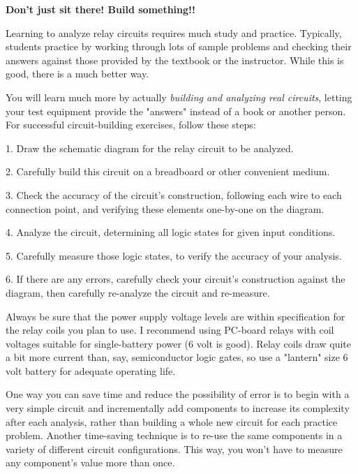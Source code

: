 

\centerline{\bf Don't just sit there!  Build something!!}

\vskip 10pt

Learning to analyze relay circuits requires much study and practice.  Typically, students practice by working through lots of sample problems and checking their answers against those provided by the textbook or the instructor.  While this is good, there is a much better way.

You will learn much more by actually {\it building and analyzing real circuits}, letting your test equipment provide the "answers" instead of a book or another person.  For successful circuit-building exercises, follow these steps:

\medskip
\item{1.} Draw the schematic diagram for the relay circuit to be analyzed.
\item{2.} Carefully build this circuit on a breadboard or other convenient medium.
\item{3.} Check the accuracy of the circuit's construction, following each wire to each connection point, and verifying these elements one-by-one on the diagram.
\item{4.} Analyze the circuit, determining all logic states for given input conditions.
\item{5.} Carefully measure those logic states, to verify the accuracy of your analysis.
\item{6.} If there are any errors, carefully check your circuit's construction against the diagram, then carefully re-analyze the circuit and re-measure.
\medskip

Always be sure that the power supply voltage levels are within specification for the relay coils you plan to use.  I recommend using PC-board relays with coil voltages suitable for single-battery power (6 volt is good).  Relay coils draw quite a bit more current than, say, semiconductor logic gates, so use a "lantern" size 6 volt battery for adequate operating life.

One way you can save time and reduce the possibility of error is to begin with a very simple circuit and incrementally add components to increase its complexity after each analysis, rather than building a whole new circuit for each practice problem.  Another time-saving technique is to re-use the same components in a variety of different circuit configurations.  This way, you won't have to measure any component's value more than once.

